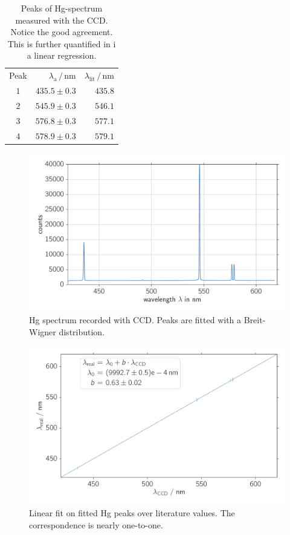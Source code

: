 \begin{table}[htpb]
    \centering
    \caption{
        Peaks of Hg-spectrum measured with the CCD. Notice the good agreement. This is further quantified in i
        a linear regression. 
        }
    \label{tab:ccd_calibration}
    \begin{tabular}{c r r}
        \rowcolor{LightCyan} Peak & $\lambda_\text{a} \,/\, \text{nm}$ & $\lambda_\text{lit} \,/\, \text{nm}$ \\
        \cellcolor{LightCyan}$1$ & $435.5 \pm 0.3$ & $435.8$   \\
        \cellcolor{LightCyan}$2$ & $545.9 \pm 0.3$ & $546.1$   \\
        \cellcolor{LightCyan}$3$ & $576.8 \pm 0.3$ & $577.1$   \\
        \cellcolor{LightCyan}$4$ & $578.9 \pm 0.3$ & $579.1$   
    \end{tabular}
\end{table}

\begin{figure}[htpb]
    \centering
    \includegraphics[width=0.8\linewidth]{analysis/figures/ccd_calibration_hg}
    \caption{Hg spectrum recorded with CCD. Peaks are fitted with a Breit-Wigner distribution.}
    \label{fig:ccd_calibration_hg}
\end{figure}

\begin{figure}[htpb]
    \centering
    \includegraphics[width=0.8\linewidth]{analysis/figures/ccd_calibration_fit}
    \caption{Linear fit on fitted Hg peaks over literature values. The correspondence is nearly one-to-one. }
    \label{fig:ccd_calibration_fit}
\end{figure}


